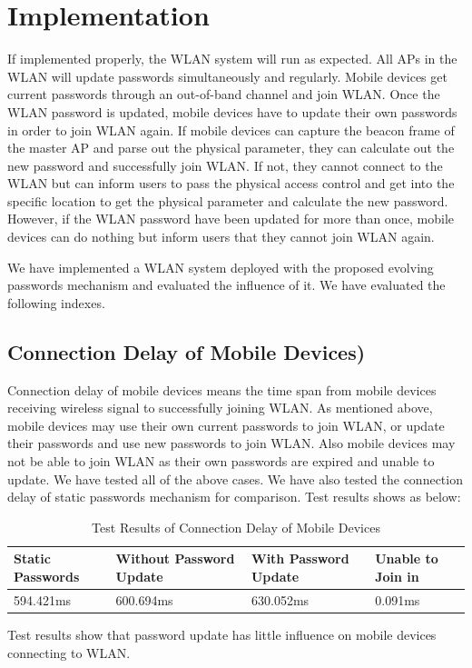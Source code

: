 \section{Implementation}
If implemented properly, the WLAN system will run as expected. All APs in the WLAN will update passwords simultaneously and regularly. Mobile devices get current passwords through an out-of-band channel and join WLAN. Once the WLAN password is updated, mobile devices have to update their own passwords in order to join WLAN again. If mobile devices can capture the beacon frame of the master AP and parse out the physical parameter, they can calculate out the new password and successfully join WLAN. If not, they cannot connect to the WLAN but can inform users to pass the physical access control and get into the specific location to get the physical parameter and calculate the new password. However, if the WLAN password have been updated for more than once, mobile devices can do nothing but inform users that they cannot join WLAN again. 

We have implemented a WLAN system deployed with the proposed evolving passwords mechanism and evaluated the influence of it. We have evaluated the following indexes. 

\subsection{Connection Delay of Mobile Devices)}
Connection delay of mobile devices means the time span from mobile devices receiving wireless signal to successfully joining WLAN. As mentioned above, mobile devices may use their own current passwords to join WLAN, or update their passwords and use new passwords to join WLAN. Also mobile devices may not be able to join WLAN as their own passwords are expired and unable to update. We have tested all of the above cases. We have also tested the connection delay of static passwords mechanism for comparison. Test results shows as below: 
\begin{table}
	\centering
	\caption{Test Results of Connection Delay of Mobile Devices}
	\label{Tab:4.1}
	\begin{tabularx}{\textwidth}{llll}
		\hline
		Static Passwords & Without Password Update & With Password Update & Unable to Join in \\
		\hline
		594.421ms & 600.694ms & 630.052ms & 0.091ms \\
		\hline
	\end{tabularx}
\end{table}
Test results show that password update has little influence on mobile devices connecting to WLAN. 


